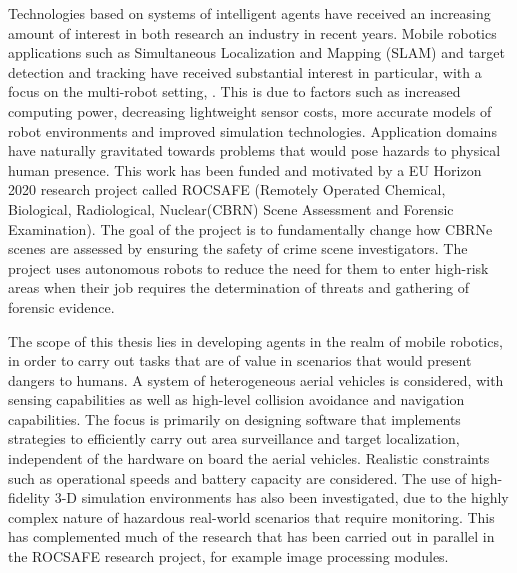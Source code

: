 Technologies based on systems of intelligent agents have received an increasing amount of interest in both research an industry in recent years. Mobile robotics applications such as Simultaneous Localization and Mapping (SLAM) and target detection and tracking have received substantial interest in particular, with a focus on the multi-robot setting\cite{Saeedi2016Multiple-RobotReview}, \cite{Robin2016Multi-robotSurvey}. This is due to factors such as increased computing power, decreasing lightweight sensor costs, more accurate models of robot environments and improved simulation technologies. Application domains have naturally gravitated towards problems that would pose hazards to physical human presence. This work has been funded and motivated by a EU Horizon 2020 research project called ROCSAFE (Remotely Operated Chemical, Biological, Radiological, Nuclear(CBRN) Scene Assessment and Forensic Examination)\cite{rocsafeNUIG}. The goal of the project is to fundamentally change how CBRNe scenes are assessed by ensuring the safety of crime scene investigators. The project uses autonomous robots to reduce the need for them to enter high-risk areas when their job requires the determination of threats and gathering of  forensic evidence.\par

The scope of this thesis lies in developing agents in the realm of mobile robotics, in order to carry out tasks that are of value in scenarios that would present dangers to humans. A system of heterogeneous aerial vehicles is considered, with sensing capabilities as well as high-level collision avoidance and navigation capabilities. The focus is primarily on designing software that implements strategies to efficiently carry out area surveillance and target localization, independent of the hardware on board the aerial vehicles. Realistic constraints such as operational speeds and battery capacity are considered. The use of high-fidelity 3-D simulation environments has also been investigated, due to the highly complex nature of hazardous real-world scenarios that require monitoring. This has complemented much of the research that has been carried out in parallel in the ROCSAFE research project, for example image processing modules.\par